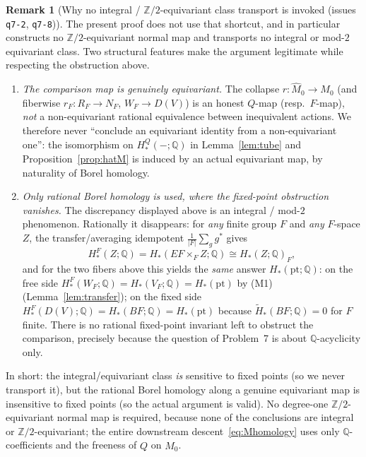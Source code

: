 \documentclass[12pt]{article}
\theoremstyle{definition}
\newtheorem{remark}[theorem]{Remark}
\begin{document}
\begin{remark}[Why no integral / $\mathbb{Z}/2$-equivariant class transport is
invoked (issues \texttt{q7-2}, \texttt{q7-8})]
The present proof does not use that shortcut, and in particular constructs no
$\mathbb{Z}/2$-equivariant normal map and transports no integral or mod-$2$
equivariant class. Two structural features make the argument legitimate while
respecting the obstruction above.
\begin{enumerate}
\item[\textup{(i)}] \emph{The comparison map is genuinely equivariant.} The
collapse $r\colon\widehat M_0\to M_0$ (and fiberwise $r_F\colon R_F\to N_F$,
$W_F\to D(V)$) is an honest $Q$-map (resp.\ $F$-map), \emph{not} a
non-equivariant rational equivalence between inequivalent actions. We therefore
never ``conclude an equivariant identity from a non-equivariant one'': the
isomorphism on $H^Q_*(-;\mathbb{Q})$ in Lemma~\ref{lem:tube} and
Proposition~\ref{prop:hatM} is induced by an actual equivariant map, by
naturality of Borel homology.
\item[\textup{(ii)}] \emph{Only \emph{rational} Borel homology is used, where the
fixed-point obstruction vanishes.} The discrepancy displayed above is an integral
/ mod-$2$ phenomenon. Rationally it disappears: for \emph{any} finite group $F$
and \emph{any} $F$-space $Z$, the transfer/averaging idempotent
$\tfrac1{|F|}\sum_{g}g^*$ gives
\[
   H^F_*(Z;\mathbb{Q})=H_*(EF\times_F Z;\mathbb{Q})\cong
   H_*(Z;\mathbb{Q})_F ,
\]
and for the two fibers above this yields the \emph{same} answer $H_*(\mathrm{pt};
\mathbb{Q})$: on the free side $H^F_*(W_F;\mathbb{Q})=H_*(V_F;\mathbb{Q})=
H_*(\mathrm{pt})$ by (M1) (Lemma~\ref{lem:transfer}); on the fixed side
$H^F_*(D(V);\mathbb{Q})=H_*(BF;\mathbb{Q})=H_*(\mathrm{pt})$ because
$\widetilde H_*(BF;\mathbb{Q})=0$ for $F$ finite. There is no rational
fixed-point invariant left to obstruct the comparison, precisely because the
question of Problem~7 is about $\mathbb{Q}$-acyclicity only.
\end{enumerate}
In short: the integral/equivariant class \emph{is} sensitive to fixed points
(so we never transport it), but the rational Borel homology along a genuine
equivariant map is insensitive to fixed points (so the actual argument is valid).
No degree-one $\mathbb{Z}/2$-equivariant normal map is required, because none of
the conclusions are integral or $\mathbb{Z}/2$-equivariant; the entire downstream
descent~\eqref{eq:Mhomology} uses only $\mathbb{Q}$-coefficients and the freeness
of $Q$ on $\widehat M_0$.
\end{remark}
\end{document}
